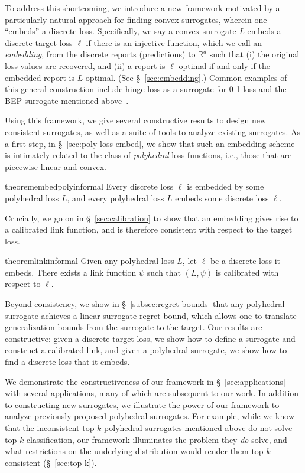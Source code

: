 \documentclass[twoside,11pt]{article}
\newcommand{\reals}{\mathbb{R}}
\begin{document}
To address this shortcoming, we introduce a new framework motivated by a particularly natural approach for finding convex surrogates, wherein one ``embeds'' a discrete loss.
Specifically, we say a convex surrogate $L$ embeds a discrete target loss $\ell$ if there is an injective function, which we call an \emph{embedding}, from the discrete reports (predictions) to $\reals^d$ such that (i) the original loss values are recovered, and (ii) a report is $\ell$-optimal if and only if the embedded report is $L$-optimal.
(See \S~\ref{sec:embedding}.)
Common examples of this general construction include hinge loss as a surrogate for 0-1 loss and the BEP surrogate mentioned above~\citep{ramaswamy2018consistent}.

Using this framework, we give several constructive results to design new consistent surrogates, as well as a suite of tools to analyze existing surrogates.
As a first step, in \S~\ref{sec:poly-loss-embed}, we show that such an embedding scheme is intimately related to the class of \emph{polyhedral} loss functions, i.e., those that are piecewise-linear and convex.
\begin{restatable}{theorem}{embedpolyinformal}\label{thm:embed-poly-main}
  Every discrete loss $\ell$ is embedded by some polyhedral loss $L$, and every polyhedral loss $L$ embeds some discrete loss $\ell$.
\end{restatable}%
\noindent
Crucially, we go on in \S~\ref{sec:calibration} to show that an embedding gives rise to a calibrated link function, and is therefore consistent with respect to the target loss.
\begin{restatable}{theorem}{linkinformal}\label{thm:link-main}
  Given any polyhedral loss $L$, let $\ell$ be a discrete loss it embeds. There exists a link function $\psi$ such that $(L,\psi)$ is calibrated with respect to $\ell$.
\end{restatable}
\noindent
Beyond consistency, we show in \S~\ref{subsec:regret-bounds} that any polyhedral surrogate achieves a linear surrogate regret bound, which allows one to translate generalization bounds from the surrogate to the target.
Our results are constructive: given a discrete target loss, we show how to define a surrogate and construct a calibrated link, and given a polyhedral surrogate, we show how to find a discrete loss that it embeds.

We demonstrate the constructiveness of our framework in \S~\ref{sec:applications} with several applications, many of which are subsequent to our work.
In addition to constructing new surrogates, we illustrate the power of our framework to analyze previously proposed polyhedral surrogates.
For example, while we know that the inconsistent top-$k$ polyhedral surrogates mentioned above do not solve top-$k$ classification, our framework illuminates the problem they \emph{do} solve, and what restrictions on the underlying distribution would render them top-$k$ consistent (\S~\ref{sec:top-k}).
\end{document}
